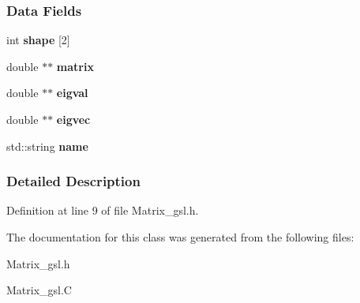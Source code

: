 \subsubsection*{Data Fields}
\begin{DoxyCompactItemize}
\item 
\mbox{\label{classMatrix_a39466a5c9a5f18d84d02f9fb7d060561}} 
int {\bfseries shape} \mbox{[}2\mbox{]}
\item 
\mbox{\label{classMatrix_a4b26a049df7108da3a46d4457afc3735}} 
double $\ast$$\ast$ {\bfseries matrix}
\item 
\mbox{\label{classMatrix_adb7fc5a84b4aa01e1417646cfc048fa8}} 
double $\ast$$\ast$ {\bfseries eigval}
\item 
\mbox{\label{classMatrix_ad12a5a14ff1acaf9862701b6f174fefb}} 
double $\ast$$\ast$ {\bfseries eigvec}
\item 
\mbox{\label{classMatrix_ab15f3c0e2ef820cc3aa6d58475b15443}} 
std\+::string {\bfseries name}
\end{DoxyCompactItemize}


\subsubsection{Detailed Description}


Definition at line 9 of file Matrix\+\_\+gsl.\+h.



The documentation for this class was generated from the following files\+:\begin{DoxyCompactItemize}
\item 
Matrix\+\_\+gsl.\+h\item 
Matrix\+\_\+gsl.\+C\end{DoxyCompactItemize}

